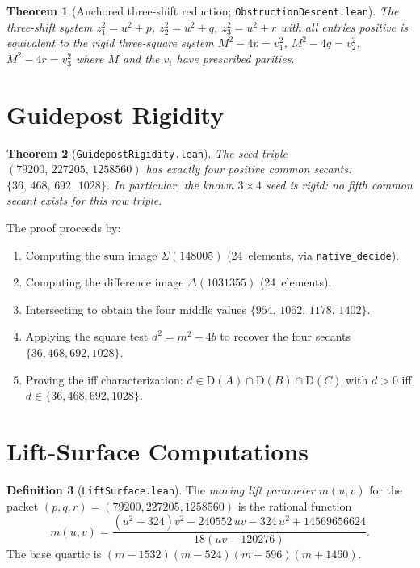 \documentclass[11pt,a4paper]{article}
\newtheorem{theorem}{Theorem}[section]
\theoremstyle{definition}
\newtheorem{definition}[theorem]{Definition}
\theoremstyle{remark}
\newcommand{\factorDiff}{\mathrm{D}}
\begin{document}
\begin{theorem}[Anchored three-shift reduction; \texttt{ObstructionDescent.lean}]
The three-shift system $z_1^2=u^2+p$, $z_2^2=u^2+q$, $z_3^2=u^2+r$
with all entries positive is equivalent to the rigid three-square
system $M^2-4p=v_1^2$, $M^2-4q=v_2^2$, $M^2-4r=v_3^2$
where $M$ and the $v_i$ have prescribed parities.
\end{theorem}

\section{Guidepost Rigidity}\label{sec:guidepost}

\begin{theorem}[\texttt{GuidepostRigidity.lean}]\label{thm:guidepost}
The seed triple $(79200,\,227205,\,1258560)$ has exactly four
positive common secants: $\{36,\,468,\,692,\,1028\}$.  In particular,
the known $3\times 4$ seed is \emph{rigid}: no fifth common secant exists
for this row triple.
\end{theorem}

The proof proceeds by:
\begin{enumerate}[nosep]
\item Computing the sum image
      $\Sigma(148005)$ (24~elements, via \texttt{native\_decide}).
\item Computing the difference image
      $\Delta(1031355)$ (24~elements).
\item Intersecting to obtain the four middle values
      $\{954,\,1062,\,1178,\,1402\}$.
\item Applying the square test $d^2 = m^2 - 4b$ to recover the four
      secants $\{36,468,692,1028\}$.
\item Proving the iff characterization:
      $d\in\factorDiff(A)\cap\factorDiff(B)\cap\factorDiff(C)$
      with $d>0$ iff $d\in\{36,468,692,1028\}$.
\end{enumerate}

\section{Lift-Surface Computations}\label{sec:lift}

\begin{definition}[\texttt{LiftSurface.lean}]
The \emph{moving lift parameter} $m(u,v)$ for the packet
$(p,q,r)=(79200,227205,1258560)$ is the rational function
\[
  m(u,v) = \frac{(u^2-324)v^2-240552\,uv-324\,u^2+14569656624}
                {18(uv-120276)}.
\]
The base quartic is
$(m-1532)(m-524)(m+596)(m+1460)$.
\end{definition}
\end{document}
